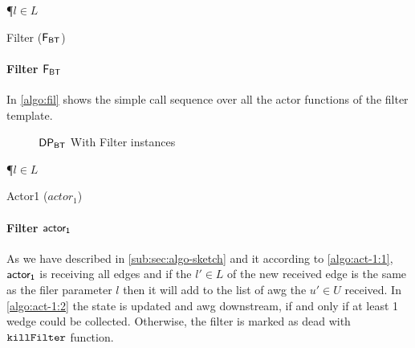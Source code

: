 \begin{algorithm}
\SetAlgoRefName{[A4]}
\P{$l \in L$}
\df{\filter{}}{
      $\actora()$\\
      $\actorb()$\\
      $\actorc()$\\
      $\actord()$\\
}
\caption{Filter ($\mathsf{F_{BT}}$)}
\label{algo:fil}
\end{algorithm}

\paragraph{Filter $\mathsf{F_{BT}}$} In \autoref{algo:fil} shows the simple call sequence over all the actor functions of the filter template. 

\begin{figure}[h]
\centering  
{}
\caption{$\mathsf{DP_{BT}}$ With Filter instances}
\label{fig:btDP_actor1}
\end{figure}
      

\begin{algorithm}
\SetAlgoRefName{[A5]}
\P{$l \in L$}
\BlankLine
{}
\caption{Actor1 ($actor_1$)}
\label{algo:act-1}
\end{algorithm}

\paragraph{Filter $\mathsf{actor_1}$} As we have described in \autoref{sub:sec:algo-sketch} and it according to \autoref{algo:act-1:1}, $\mathsf{actor_1}$ is receiving all edges 
and if the $l' \in L$ of the new received edge is the same as the filer parameter $l$ then it will add to the list of \acrshort{awg} the $u' \in U$ received. 
In \autoref{algo:act-1:2} the state is updated and \acrshort{awg} downstream, if and only if at least 1 wedge could be collected. Otherwise, the filter is marked as dead with $\mathtt{killFilter}$ function.

